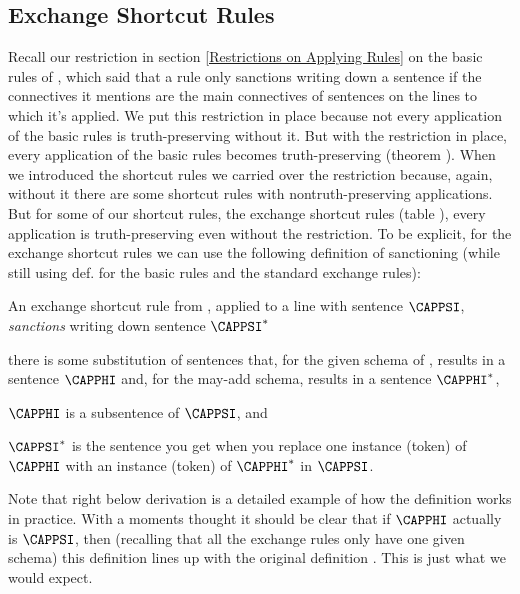 \subsection{Exchange Shortcut Rules}\label{Exchange Shortcut Rules GSD}
Recall our restriction in section \ref{Restrictions on Applying Rules} on the basic rules of \GSD{}, which said that a rule only sanctions writing down a sentence if the connectives it mentions are the main connectives of sentences on the lines to which it's applied. 
We put this restriction in place because not every application of the basic rules is truth-preserving without it. 
But with the restriction in place, every application of the basic rules becomes truth-preserving (theorem ). 
When we introduced the shortcut rules we carried over the restriction because, again, without it there are some shortcut rules with nontruth-preserving applications. 
But for some of our shortcut rules, the exchange shortcut rules (table ), every application is truth-preserving even without the restriction. 
To be explicit, for the exchange shortcut rules we can use the following definition of sanctioning (while still using def.  for the basic rules and the standard exchange rules):
\begin{majorILnc}{}
An exchange shortcut rule  from \GSDP{}, applied to a line with sentence $\CAPPSI$, \emph{sanctions} writing down sentence $\CAPPSI^*$ \Iff
\begin{cenumerate}
\item there is some substitution of \GSL{} sentences that, for the given schema of , results in a sentence $\CAPPHI$ and, for the may-add schema, results in a sentence $\CAPPHI^*$,
\item $\CAPPHI$ is a subsentence of $\CAPPSI$, and
\item $\CAPPSI^*$ is the \GSL{} sentence you get when you replace one instance (token) of $\CAPPHI$ with an instance (token) of $\CAPPHI^*$ in $\CAPPSI$. 
\end{cenumerate}
\end{majorILnc}
\noindent{}Note that right below derivation  is a detailed example of how the definition works in practice. 
With a moments thought it should be clear that if $\CAPPHI$ actually is $\CAPPSI$, then (recalling that all the exchange rules only have one given schema) this definition lines up with the original definition . This is just what we would expect.
